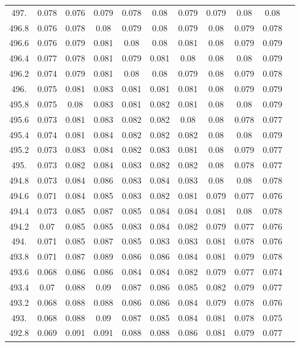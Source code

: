 \documentclass[12pt]{ctexart}
\numberwithin{equation}{section}
\begin{document}
\begin{longtable}{ccccccccccc}
497.	&	0.078	&	0.076	&	0.079	&	0.078	&	0.08	&	0.079	&	0.079	&	0.08	&	0.08	\\
496.8	&	0.076	&	0.078	&	0.08	&	0.079	&	0.08	&	0.079	&	0.08	&	0.079	&	0.078	\\
496.6	&	0.076	&	0.079	&	0.081	&	0.08	&	0.08	&	0.081	&	0.08	&	0.079	&	0.079	\\
496.4	&	0.077	&	0.078	&	0.081	&	0.079	&	0.081	&	0.08	&	0.08	&	0.08	&	0.079	\\
496.2	&	0.074	&	0.079	&	0.081	&	0.08	&	0.08	&	0.079	&	0.08	&	0.079	&	0.078	\\
496.	&	0.075	&	0.081	&	0.083	&	0.081	&	0.081	&	0.081	&	0.08	&	0.079	&	0.079	\\
495.8	&	0.075	&	0.08	&	0.083	&	0.081	&	0.082	&	0.081	&	0.08	&	0.08	&	0.079	\\
495.6	&	0.073	&	0.081	&	0.083	&	0.082	&	0.082	&	0.08	&	0.08	&	0.078	&	0.077	\\
495.4	&	0.074	&	0.081	&	0.084	&	0.082	&	0.082	&	0.082	&	0.08	&	0.08	&	0.079	\\
495.2	&	0.073	&	0.083	&	0.084	&	0.082	&	0.083	&	0.081	&	0.08	&	0.079	&	0.077	\\
495.	&	0.073	&	0.082	&	0.084	&	0.083	&	0.082	&	0.082	&	0.08	&	0.078	&	0.077	\\
494.8	&	0.073	&	0.084	&	0.086	&	0.083	&	0.084	&	0.083	&	0.08	&	0.08	&	0.078	\\
494.6	&	0.071	&	0.084	&	0.085	&	0.083	&	0.082	&	0.081	&	0.079	&	0.077	&	0.076	\\
494.4	&	0.073	&	0.085	&	0.087	&	0.085	&	0.084	&	0.084	&	0.081	&	0.08	&	0.078	\\
494.2	&	0.07	&	0.085	&	0.085	&	0.083	&	0.084	&	0.082	&	0.079	&	0.077	&	0.076	\\
494.	&	0.071	&	0.085	&	0.087	&	0.085	&	0.083	&	0.083	&	0.081	&	0.078	&	0.076	\\
493.8	&	0.071	&	0.087	&	0.089	&	0.086	&	0.086	&	0.084	&	0.081	&	0.079	&	0.078	\\
493.6	&	0.068	&	0.086	&	0.086	&	0.084	&	0.084	&	0.082	&	0.079	&	0.077	&	0.074	\\
493.4	&	0.07	&	0.088	&	0.09	&	0.087	&	0.086	&	0.085	&	0.082	&	0.079	&	0.077	\\
493.2	&	0.068	&	0.088	&	0.088	&	0.086	&	0.086	&	0.084	&	0.079	&	0.078	&	0.076	\\
493.	&	0.068	&	0.088	&	0.09	&	0.087	&	0.085	&	0.084	&	0.081	&	0.078	&	0.075	\\
492.8	&	0.069	&	0.091	&	0.091	&	0.088	&	0.088	&	0.086	&	0.081	&	0.079	&	0.077	\\

\end{longtable}
\end{document}
